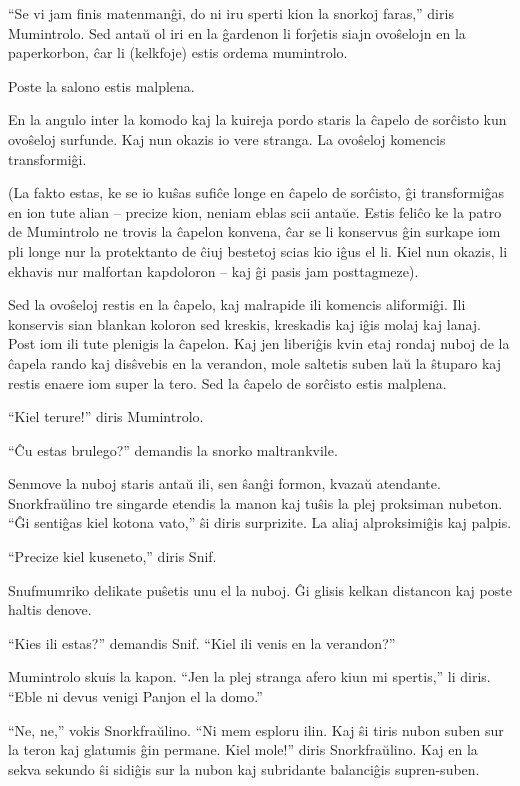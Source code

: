 ``Se vi jam finis matenmanĝi, do ni iru sperti kion la snorkoj faras,'' diris Mumintrolo. Sed antaŭ ol iri en la ĝardenon li forĵetis siajn ovoŝelojn en la paperkorbon, ĉar li (kelkfoje) estis ordema mumintrolo.

Poste la salono estis malplena.

En la angulo inter la komodo kaj la kuireja pordo staris la ĉapelo de sorĉisto kun ovoŝeloj surfunde. Kaj nun okazis io vere stranga. La ovoŝeloj komencis transformiĝi.

(La fakto estas, ke se io kuŝas sufiĉe longe en ĉapelo de sorĉisto, ĝi transformiĝas en ion tute alian -- precize kion, neniam eblas scii antaŭe. Estis feliĉo ke la patro de Mumintrolo ne trovis la ĉapelon konvena, ĉar se li konservus ĝin surkape iom pli longe nur la protektanto de ĉiuj bestetoj scias kio iĝus el li. Kiel nun okazis, li ekhavis nur malfortan kapdoloron -- kaj ĝi pasis jam posttagmeze).

Sed la ovoŝeloj restis en la ĉapelo, kaj malrapide ili komencis aliformiĝi. Ili konservis sian blankan koloron sed kreskis, kreskadis kaj iĝis molaj kaj lanaj. Post iom ili tute plenigis la ĉapelon. Kaj jen liberiĝis kvin etaj rondaj nuboj de la ĉapela rando kaj disŝvebis en la verandon, mole saltetis suben laŭ la ŝtuparo kaj restis enaere iom super la tero. Sed la ĉapelo de sorĉisto estis malplena.

``Kiel terure!'' diris Mumintrolo.

``Ĉu estas brulego?'' demandis la snorko maltrankvile.

Senmove la nuboj staris antaŭ ili, sen ŝanĝi formon, kvazaŭ atendante. Snorkfraŭlino tre singarde etendis la manon kaj tuŝis la plej proksiman nubeton. ``Ĝi sentiĝas kiel kotona vato,'' ŝi diris surprizite. La aliaj alproksimiĝis kaj palpis.

``Precize kiel kuseneto,'' diris Snif.

Snufmumriko delikate puŝetis unu el la nuboj. Ĝi glisis kelkan distancon kaj poste haltis denove.

``Kies ili estas?'' demandis Snif. ``Kiel ili venis en la verandon?''

Mumintrolo skuis la kapon. ``Jen la plej stranga afero kiun mi spertis,'' li diris. ``Eble ni devus venigi Panjon el la domo.''

``Ne, ne,'' vokis Snorkfraŭlino. ``Ni mem esploru ilin. Kaj ŝi tiris nubon suben sur la teron kaj glatumis ĝin permane. Kiel mole!'' diris Snorkfraŭlino. Kaj en la sekva sekundo ŝi sidiĝis sur la nubon kaj subridante balanciĝis supren-suben.

